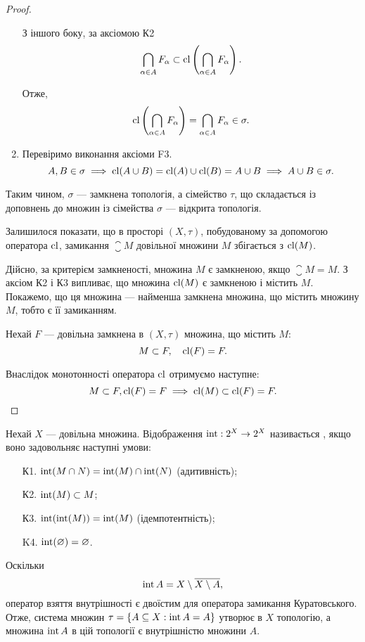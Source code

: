 \begin{proof}
\begin{enumerate}
З іншого боку, за аксіомою К2 \[ \bigcap_{\alpha \in A} F_\alpha \subset \operatorname{cl} \left(\bigcap_{\alpha \in A} F_\alpha \right). \]

Отже, \[ \operatorname{cl} \left(\bigcap_{\alpha \in A} F_\alpha \right) = \bigcap_{\alpha \in A} F_\alpha \in \sigma. \]

\item Перевіримо виконання аксіоми F3. \[A, B \in \sigma \implies \operatorname{cl}(A\cup B) = \operatorname{cl}(A)\cup \operatorname{cl}(B) = A\cup B \implies A\cup B\in\sigma.\]
\end{enumerate}

Таким чином, $\sigma$ --- замкнена топологія, а сімейство $\tau$, що
складається із доповнень до множин із сімейства $\sigma$ ---
відкрита топологія.

Залишилося показати, що в просторі $(X, \tau)$, побудованому
за допомогою оператора $\operatorname{cl}$, замикання $\closure{M}$ довільної
множини $M$ збігається з $\operatorname{cl}(M)$.

Дійсно, за критерієм замкненості, множина $M$ є замкненою, якщо
$\closure{M} = M$. З аксіом К2 і К3 випливає, що множина $\operatorname{cl}(M)$ є
замкненою і містить $M$. Покажемо, що ця множина ---
найменша замкнена множина, що містить множину $M$,
тобто є її замиканням.

Нехай $F$ --- довільна замкнена в $(X, \tau)$ множина, що
містить $M$: \[ M \subset F, \quad \operatorname{cl}(F) = F. \]

Внаслідок монотонності оператора $\operatorname{cl}$ отримуємо
наступне: \[ M \subset F, \operatorname{cl}(F) = F \implies \operatorname{cl}(M) \subset \operatorname{cl}(F) = F. \qedhere \]
\end{proof}

\begin{definition}
Нехай $X$ --- довільна множина. Відображення $\operatorname{int}: 2^X \to 2^X$ називається , якщо воно задовольняє
наступні умови:
\begin{enumerate}
\item[К1.] $\operatorname{int}(M \cap N) = \operatorname{int}(M)\cap \operatorname{int}(N)$ (адитивність);
\item[К2.] $\operatorname{int}(M) \subset M$;
\item[К3.] $\operatorname{int}(\operatorname{int}(M)) = \operatorname{int}(M)$ (ідемпотентність);
\item[K4.] $\operatorname{int}(\varnothing) = \varnothing$.
\end{enumerate}
\end{definition}

\begin{corollary}
Оскільки \[\operatorname{int} A = X \setminus \overline{X \setminus A}, \]
оператор взяття внутрішності є двоїстим для оператора
замикання Куратовського. Отже, система множин
$\tau = \{A \subseteq X: \operatorname{int} A = A\}$ утворює в $X$ топологію, а множина
$\operatorname{int} A$ в цій топології є внутрішністю множини $A$.
\end{corollary}

